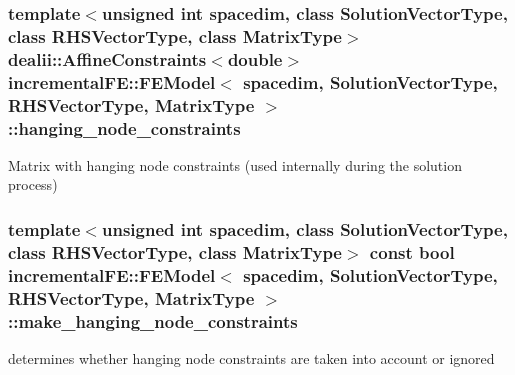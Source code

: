 \subsubsection[{\texorpdfstring{hanging\+\_\+node\+\_\+constraints}{hanging_node_constraints}}]{\setlength{\rightskip}{0pt plus 5cm}template$<$unsigned int spacedim, class Solution\+Vector\+Type, class R\+H\+S\+Vector\+Type, class Matrix\+Type$>$ dealii\+::\+Affine\+Constraints$<$double$>$ {\bf incremental\+F\+E\+::\+F\+E\+Model}$<$ spacedim, Solution\+Vector\+Type, R\+H\+S\+Vector\+Type, Matrix\+Type $>$\+::hanging\+\_\+node\+\_\+constraints\hspace{0.3cm}{\ttfamily [private]}}\hypertarget{classincremental_f_e_1_1_f_e_model_af333d1d12e78c27c74b033a85d075d38}{}\label{classincremental_f_e_1_1_f_e_model_af333d1d12e78c27c74b033a85d075d38}
Matrix with hanging node constraints (used internally during the solution process) 
\subsubsection[{\texorpdfstring{make\+\_\+hanging\+\_\+node\+\_\+constraints}{make_hanging_node_constraints}}]{\setlength{\rightskip}{0pt plus 5cm}template$<$unsigned int spacedim, class Solution\+Vector\+Type, class R\+H\+S\+Vector\+Type, class Matrix\+Type$>$ const bool {\bf incremental\+F\+E\+::\+F\+E\+Model}$<$ spacedim, Solution\+Vector\+Type, R\+H\+S\+Vector\+Type, Matrix\+Type $>$\+::make\+\_\+hanging\+\_\+node\+\_\+constraints\hspace{0.3cm}{\ttfamily [private]}}\hypertarget{classincremental_f_e_1_1_f_e_model_a65b5910cfba2feb26933ad451ceff628}{}\label{classincremental_f_e_1_1_f_e_model_a65b5910cfba2feb26933ad451ceff628}
determines whether hanging node constraints are taken into account or ignored 

